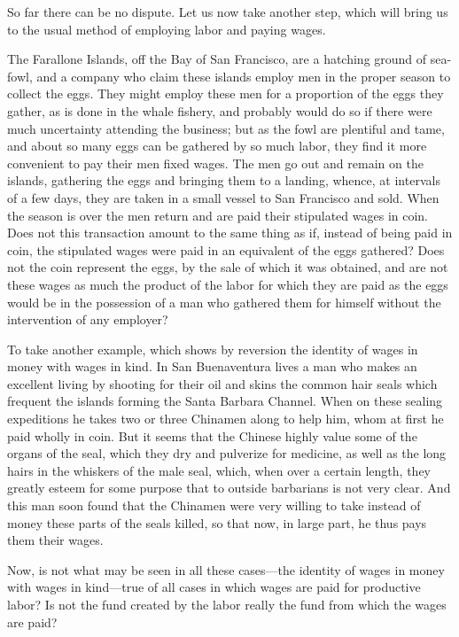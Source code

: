 So far there can be no dispute. Let us now take another step, which will
bring us to the usual method of employing labor and paying wages.

The Farallone Islands, off the Bay of San Francisco, are a hatching
ground of sea-fowl, and a company who claim these islands employ men in
the proper season to collect the eggs. They might employ these men for a
proportion of the eggs they gather, as is done in the whale fishery, and
probably would do so if there were much uncertainty attending the
business; but as the fowl are plentiful and tame, and about so many eggs
can be gathered by so much labor, they find it more convenient to pay
their men fixed wages. The men go out and remain on the islands,
gathering the eggs and bringing them to a landing, whence, at intervals
of a few days, they are taken in a small vessel to San Francisco and
sold. When the season is over the men return and are paid their
stipulated wages in coin. Does not this transaction amount to the same
thing as if, instead of being paid in coin, the stipulated wages were
paid in an equivalent of the eggs gathered? Does not the coin represent
the eggs, by the sale of which it was obtained, and are not these wages
as much the product of the labor for which they are paid as the eggs
would be in the possession of a man who gathered them for himself
without the intervention of any employer?

To take another example, which shows by reversion the identity of wages
in money with wages in kind. In San Buenaventura lives a man who makes
an excellent living by shooting for their oil and skins the common hair
seals which frequent the islands forming the Santa Barbara Channel. When
on these sealing expeditions he takes two or three Chinamen along to
help him, whom at first he paid wholly in coin. But it seems that the
Chinese highly value some of the organs of the seal, which they dry and
pulverize for medicine, as well as the long hairs in the whiskers of the
male seal, which, when over a certain length, they greatly esteem for
some purpose that to outside barbarians is not very clear. And this man
soon found that the Chinamen were very willing to take instead of money
these parts of the seals killed, so that now, in large part, he thus
pays them their wages.

Now, is not what may be seen in all these cases---the identity of wages
in money with wages in kind---true of all cases in which wages are paid
for productive labor? Is not the fund created by the labor really the
fund from which the wages are paid?

